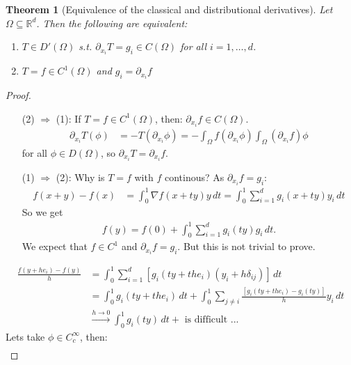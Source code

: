 \documentclass{report}
\theoremstyle{tommy}
\newtheorem{thm}[defn]{Theorem}
\begin{document}
  \begin{thm}[Equivalence of the classical and distributional derivatives]
      Let \(\Omega \subseteq \mathbb{R}^d\). Then the following are equivalent:
      \begin{enumerate}
        \item \(T \in D'(\Omega)\) s.t. \(\partial_{x_i} T = g_i \in C(\Omega)\) for all \(i = 1, \dots, d\).
        \item \(T = f \in C^1(\Omega)\) and \(g_i = \partial_{x_i} f\)
      \end{enumerate}
  \end{thm}

  \begin{proof} \
    \begin{itemize}
      \item [(2) \(\Rightarrow\) (1):] If \(T = f \in C^1(\Omega)\), then: \(\partial_{x_i} f \in C(\Omega)\).
      \begin{align*}
        \partial_{x_i} T(\phi) &= - T(\partial_{x_i} \phi) 
        = - \int_\Omega f(\partial_{x_i} \phi) \int_\Omega (\partial_{x_i} f) \phi
      \end{align*}
      for all \(\phi \in D(\Omega)\), so \(\partial_{x_i} T = \partial_{x_i} f\).
      \item [(1) \(\Rightarrow\) (2):] Why is \(T = f\) with \(f\) continous? As \(\partial_{x_i} f = g_i\): 
      \begin{align*}
        f(x+y) - f(x) 
        &= \int_0^1 \nabla f(x+ty) y \, dt
        = \int_0^1 \sum_{i=1}^d g_i(x + ty) y_i \, dt
      \end{align*}
      So we get
      \begin{align*}
        f(y) = f(0) + \int_0^1 \sum_{i=1}^d g_i(ty) g_i \, dt.
      \end{align*}
      We expect that \(f \in C^1\) and \(\partial_{x_i} f = g_i\). But this is not trivial to prove.
    \end{itemize}
    \begin{align*}
      \frac{f(y + he_i) - f(y)}{h} 
      &= \int_0^1 \sum_{i=1}^d [g_i(ty + the_i)(y_i + h \delta_{ij})] \, dt \\
      &= \int_0^1 g_i(ty + the_i) \, dt + \int_0^1 \sum_{j \ne i} \frac{[g_i(ty + the_i) - g_i(ty)]}{h} y_i \, dt \\
      &\xrightarrow{h \to 0} \int_0^1 g_i(ty) \, dt  + \text{ is difficult ...}
    \end{align*}
    Lets take \(\phi \in C_c^\infty\), then:
    \begin{align*}

\end{align*}
\end{proof}
\end{document}
